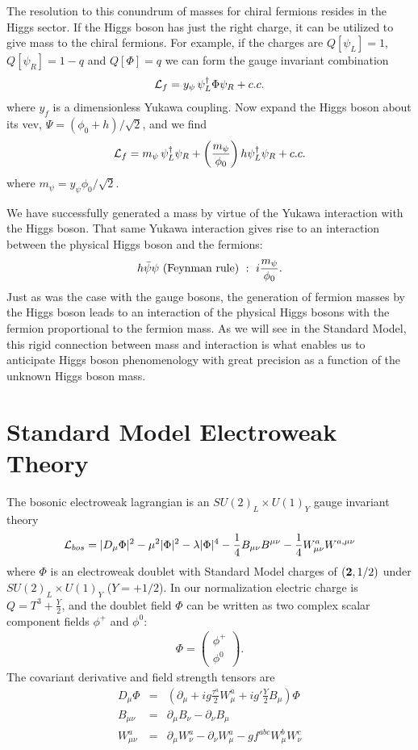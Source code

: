 \documentclass[12pt]{article}
\def\beq{\begin{eqnarray}}
\def\eeq{\end{eqnarray}}
\def\bea{\begin{eqnarray}}
\def\eea{\end{eqnarray}}
\def\xsection#1{\section{#1}}
\begin{document}
The resolution to this conundrum of masses for chiral fermions resides in the Higgs sector. If the Higgs boson has just the right charge, it can be utilized to give mass to the chiral fermions. For example, if the charges are $Q[\psi_L]=1$, $Q[\psi_R]=1-q$ and $Q[\Phi]=q$ we can form the gauge invariant combination 
\beq
{\cal L}_f=y_\psi\, \psi_L^\dagger \Phi\psi_R+c.c.
\eeq
where $y_f$ is a dimensionless Yukawa coupling.  Now expand the Higgs boson about its vev, $\Psi=(\phi_0+h)/\sqrt{2}$, and we find
\beq
{\cal L}_f=m_\psi\, \psi_L^\dagger\psi_R+ \left(\frac{m_\psi}{\phi_0} \right)h \psi_L^\dagger\psi_R+c.c.
\eeq
where $m_\psi=y_\psi \phi_0/\sqrt{2}$.

We have successfully generated a mass by virtue of the Yukawa interaction with the Higgs boson. That same Yukawa interaction gives rise to an interaction between the physical Higgs boson and the fermions:
\beq
h\bar\psi\psi~{\rm (Feynman~rule)}~:~ i\frac{m_\psi}{\phi_0}.
\eeq
Just as was the case with the gauge bosons, the generation of fermion masses by the Higgs boson leads to an interaction of the physical Higgs bosons with the fermion proportional to the fermion mass.
As we will see in the Standard Model, this rigid connection between mass and interaction is what enables us to anticipate Higgs boson phenomenology with great precision as a function of the unknown Higgs boson mass.


\xsection{Standard Model Electroweak Theory}

The bosonic electroweak lagrangian is an $SU(2)_L\times U(1)_Y$ gauge invariant theory
\beq
{\cal L}_{bos}=|D_\mu \Phi |^2-\mu^2|\Phi |^2-\lambda |\Phi |^4-\frac{1}{4}B_{\mu\nu}B^{\mu\nu}
-\frac{1}{4}W^a_{\mu\nu}W^{a,\mu\nu}
\eeq
where $\Phi$ is an electroweak doublet with Standard Model charges of $({\bf 2},1/2)$ under $SU(2)_L\times U(1)_Y$ ($Y=+1/2$). In our normalization electric charge is $Q=T^3+\frac{Y}{2}$, and the doublet field $\Phi$ can be written as two complex scalar component fields $\phi^+$ and $\phi^0$:
\beq
\Phi=\left( \begin{array}{c} \phi^+ \\ \phi^0\end{array}\right).
\label{eq:higgs em}
\eeq
The covariant derivative and field strength tensors are
\bea
D_\mu \Phi & = &\left( \partial_\mu+ig\frac{\tau^a}{2}W^{a}_{\mu}+ig'\frac{Y}{2}B_\mu\right) \Phi \\
B_{\mu\nu}&=&\partial_\mu B_\nu-\partial_\nu B_\mu \\
W^a_{\mu\nu} & = & \partial_\mu W^a_\nu-\partial_\nu W^a_\mu-g f^{abc}W^b_\mu W^c_\nu
\eea
\end{document}
